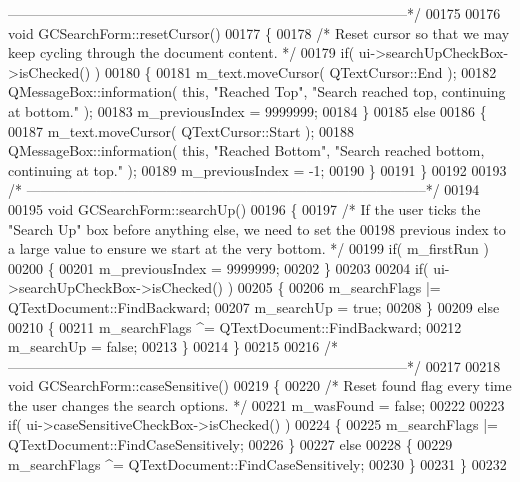 \begin{DoxyCode}
{{      --------------------------------------------------------------------------------------*/}
00175 
00176 \textcolor{keywordtype}{void} GCSearchForm::resetCursor()
00177 \{
00178   \textcolor{comment}{/* Reset cursor so that we may keep cycling through the document content. */}
00179   \textcolor{keywordflow}{if}( ui->searchUpCheckBox->isChecked() )
00180   \{
00181     m\_text.moveCursor( QTextCursor::End );
00182     QMessageBox::information( \textcolor{keyword}{this}, \textcolor{stringliteral}{"Reached Top"}, \textcolor{stringliteral}{"Search reached top,
       continuing at bottom."} );
00183     m\_previousIndex = 9999999;
00184   \}
00185   \textcolor{keywordflow}{else}
00186   \{
00187     m\_text.moveCursor( QTextCursor::Start );
00188     QMessageBox::information( \textcolor{keyword}{this}, \textcolor{stringliteral}{"Reached Bottom"}, \textcolor{stringliteral}{"Search reached bottom,
       continuing at top."} );
00189     m\_previousIndex = -1;
00190   \}
00191 \}
00192 
00193 \textcolor{comment}{/*
      --------------------------------------------------------------------------------------*/}
00194 
00195 \textcolor{keywordtype}{void} GCSearchForm::searchUp()
00196 \{
00197   \textcolor{comment}{/* If the user ticks the "Search Up" box before anything else, we need to set
       the}
00198 \textcolor{comment}{    previous index to a large value to ensure we start at the very bottom. */}
00199   \textcolor{keywordflow}{if}( m\_firstRun )
00200   \{
00201     m\_previousIndex = 9999999;
00202   \}
00203 
00204   \textcolor{keywordflow}{if}( ui->searchUpCheckBox->isChecked() )
00205   \{
00206     m\_searchFlags |= QTextDocument::FindBackward;
00207     m\_searchUp = \textcolor{keyword}{true};
00208   \}
00209   \textcolor{keywordflow}{else}
00210   \{
00211     m\_searchFlags ^= QTextDocument::FindBackward;
00212     m\_searchUp = \textcolor{keyword}{false};
00213   \}
00214 \}
00215 
00216 \textcolor{comment}{/*
      --------------------------------------------------------------------------------------*/}
00217 
00218 \textcolor{keywordtype}{void} GCSearchForm::caseSensitive()
00219 \{
00220   \textcolor{comment}{/* Reset found flag every time the user changes the search options. */}
00221   m\_wasFound = \textcolor{keyword}{false};
00222 
00223   \textcolor{keywordflow}{if}( ui->caseSensitiveCheckBox->isChecked() )
00224   \{
00225     m\_searchFlags |= QTextDocument::FindCaseSensitively;
00226   \}
00227   \textcolor{keywordflow}{else}
00228   \{
00229     m\_searchFlags ^= QTextDocument::FindCaseSensitively;
00230   \}
00231 \}
00232 
}
\end{DoxyCode}
